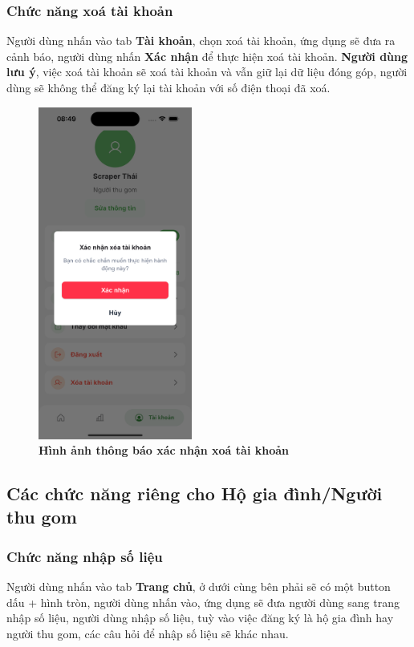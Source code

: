\subsubsection{Chức năng xoá tài khoản}
Người dùng nhấn vào tab \textbf{Tài khoản}, chọn xoá tài khoản, ứng dụng sẽ đưa ra cảnh báo, người dùng nhấn \textbf{Xác nhận} để thực hiện xoá tài khoản. \textbf{Người dùng lưu ý}, việc xoá tài khoản sẽ xoá tài khoản và vẫn giữ lại dữ liệu đóng góp, người dùng sẽ không thể đăng ký lại tài khoản với số điện thoại đã xoá.
\begin{figure}[H]
  \centering
  \includegraphics[width=0.45\textwidth]{Images/mobile/delete_account_dialog.png}
  \caption[Hình ảnh thông báo xác nhận xoá tài khoản]{\bfseries \fontsize{12pt}{0pt}
  \selectfont Hình ảnh thông báo xác nhận xoá tài khoản}
  \label{delete_account_dialog} %
\end{figure}
\subsection{Các chức năng riêng cho Hộ gia đình/Người thu gom}
\subsubsection{Chức năng nhập số liệu}
Người dùng nhấn vào tab \textbf{Trang chủ}, ở dưới cùng bên phải sẽ có một button dấu + hình tròn, người dùng nhấn vào, ứng dụng sẽ đưa người dùng sang trang nhập số liệu, người dùng nhập số liệu, tuỳ vào việc đăng ký là hộ gia đình hay người thu gom, các câu hỏi để nhập số liệu sẽ khác nhau.

